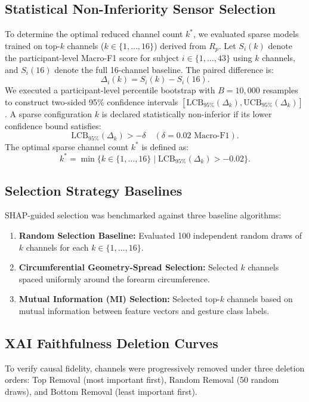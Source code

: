 \documentclass[final,5p,times,twocolumn]{elsarticle}
\begin{document}
\subsection{Statistical Non-Inferiority Sensor Selection}
To determine the optimal reduced channel count $k^*$, we evaluated sparse models trained on top-$k$ channels ($k \in \{1, \dots, 16\}$) derived from $R_p$. Let $S_i(k)$ denote the participant-level Macro-F1 score for subject $i \in \{1, \dots, 43\}$ using $k$ channels, and $S_i(16)$ denote the full 16-channel baseline. The paired difference is:
\begin{equation}
    \Delta_i(k) = S_i(k) - S_i(16).
\end{equation}
We executed a participant-level percentile bootstrap with $B = 10,000$ resamples to construct two-sided 95\% confidence intervals $[\text{LCB}_{95\%}(\Delta_k), \text{UCB}_{95\%}(\Delta_k)]$. A sparse configuration $k$ is declared statistically non-inferior if its lower confidence bound satisfies:
\begin{equation}
    \text{LCB}_{95\%}(\Delta_k) > -\delta \quad (\delta = 0.02 \text{ Macro-F1}).
\end{equation}
The optimal sparse channel count $k^*$ is defined as:
\begin{equation}
    k^* = \min \{ k \in \{1, \dots, 16\} \mid \text{LCB}_{95\%}(\Delta_k) > -0.02 \}.
\end{equation}

\subsection{Selection Strategy Baselines}
SHAP-guided selection was benchmarked against three baseline algorithms:
\begin{enumerate}
    \item \textbf{Random Selection Baseline:} Evaluated 100 independent random draws of $k$ channels for each $k \in \{1, \dots, 16\}$.
    \item \textbf{Circumferential Geometry-Spread Selection:} Selected $k$ channels spaced uniformly around the forearm circumference.
    \item \textbf{Mutual Information (MI) Selection:} Selected top-$k$ channels based on mutual information between feature vectors and gesture class labels.
\end{enumerate}

\subsection{XAI Faithfulness Deletion Curves}
To verify causal fidelity, channels were progressively removed under three deletion orders: Top Removal (most important first), Random Removal (50 random draws), and Bottom Removal (least important first).
\end{document}
